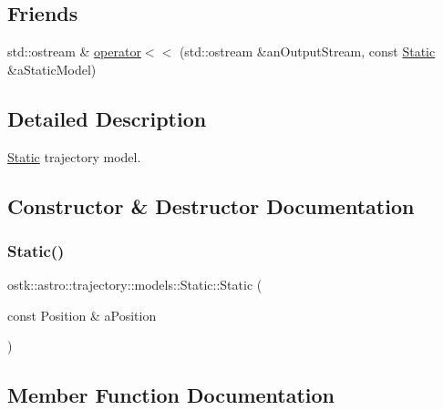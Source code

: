 \subsection*{Friends}
\begin{DoxyCompactItemize}
\item 
std\+::ostream \& \hyperlink{classostk_1_1astro_1_1trajectory_1_1models_1_1_static_a6494cb538d45101dc20cb3910455cb13}{operator$<$$<$} (std\+::ostream \&an\+Output\+Stream, const \hyperlink{classostk_1_1astro_1_1trajectory_1_1models_1_1_static}{Static} \&a\+Static\+Model)
\end{DoxyCompactItemize}


\subsection{Detailed Description}
\hyperlink{classostk_1_1astro_1_1trajectory_1_1models_1_1_static}{Static} trajectory model. 

\subsection{Constructor \& Destructor Documentation}
\mbox{\label{classostk_1_1astro_1_1trajectory_1_1models_1_1_static_a8d7240ef6b3ae12d6bdb4320b225a146}} 
\subsubsection{\texorpdfstring{Static()}{Static()}}
{\footnotesize\ttfamily ostk\+::astro\+::trajectory\+::models\+::\+Static\+::\+Static (\begin{DoxyParamCaption}\item[{const Position \&}]{a\+Position }\end{DoxyParamCaption})}



\subsection{Member Function Documentation}
\mbox{\label{classostk_1_1astro_1_1trajectory_1_1models_1_1_static_a4297a74c953a105dc887a31227fbe1ff}} 
